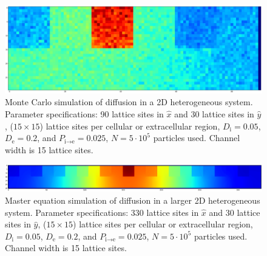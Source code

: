 	\begin{figure}[h!]
		\centering
		\includegraphics[width=1.0\linewidth]{../images/2D/MC_heterogeneous_3U_2D}
		\caption[2D: Monte Carlo solution for a heterogeneous system]{Monte Carlo simulation of diffusion in a 2D heterogeneous system. Parameter specifications: 90 lattice sites in $ \hat{x} $ and 30 lattice sites in $ \hat{y} $, ($ 15 \times 15 $) lattice sites per cellular or extracellular region, $ D_\textrm{i} = 0.05 $, $ D_\textrm{e} = 0.2 $, and $ P_{\textrm{i}\rightarrow \textrm{e}} = 0.025 $, $ N = 5 \cdot 10^5 $ particles used. Channel width is 15 lattice sites.}
		\label{fig:MC_heterogeneous_3U_2D}
	\end{figure}
	
	\begin{figure}[h!]
		\centering
		\includegraphics[width=1.0\linewidth]{../images/2D/heterogeneous_11U_2D}
		\caption[2D: Master equation solution for a heterogeneous system (extended)]{Master equation simulation of diffusion in a larger 2D heterogeneous system. Parameter specifications: 330 lattice sites in $ \hat{x} $ and 30 lattice sites in $ \hat{y} $, ($ 15 \times 15 $) lattice sites per cellular or extracellular region, $ D_\textrm{i} = 0.05 $, $ D_\textrm{e} = 0.2 $, and $ P_{\textrm{i}\rightarrow \textrm{e}} = 0.025 $, $ N = 5 \cdot 10^5 $ particles used. Channel width is 15 lattice sites.}
		\label{fig:heterogeneous_11U_2D}
	\end{figure}
	
